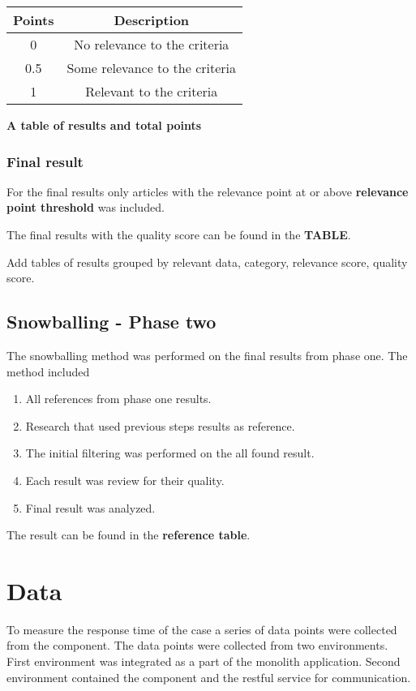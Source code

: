 \begin{flushleft}
\begin{tabular}{|c c|} 
 \hline
 Points & Description \\ [0.5ex] 
 \hline
  0 & No relevance to the criteria  \\ 
 \hline
  0.5 & Some relevance to the criteria \\ 
 \hline
 1 & Relevant to the criteria \\ 
 \hline
\end{tabular}
\end{flushleft}

\textbf{A table of results and total points}

\subsubsection{Final result}
For the final results only articles with the relevance point at or above \textbf{relevance point threshold} was included.

The final results with the quality score can be found in the \textbf{TABLE}.

Add tables of results grouped by relevant data, category, relevance score, quality score.

\subsection{Snowballing - Phase two}
The snowballing method was performed on the final results from phase one.
The method included 
\begin{enumerate}
    \item All references from phase one results.
    \item Research that used previous steps results as reference.
    \item The initial filtering was performed on the all found result.
    \item Each result was review for their quality.
    \item Final result was analyzed. 
\end{enumerate}

The result can be found in the \textbf{reference table}.

\section{Data}
To measure the response time of the case a series of data points were collected from the component.
The data points were collected from two environments.
First environment was integrated as a part of the monolith application.
Second environment contained the component and the restful service for communication.


